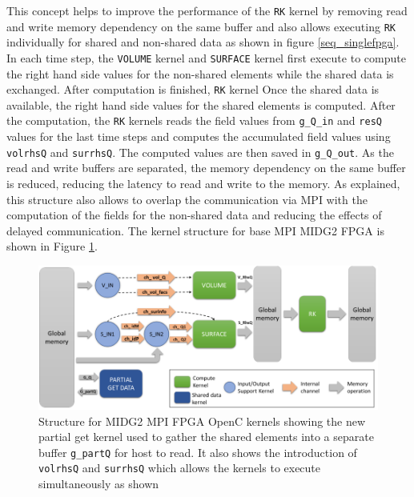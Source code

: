 This concept helps to improve the performance of the \texttt{RK} kernel
by removing read and write memory dependency on the same buffer and also allows executing
\texttt{RK} individually for shared and non-shared data as shown in figure \ref{seq_singlefpga}.
In each time step, the \texttt{VOLUME} kernel and \texttt{SURFACE} kernel first execute to compute the right hand side values for the
non-shared elements while the shared data is exchanged. After computation is finished, \texttt{RK} kernel Once the shared data is available,
the right hand side values for the shared elements is computed. After the computation,
the \texttt{RK} kernels reads the field values from \texttt{g\_Q\_in} and \texttt{resQ} values
for the last time steps and computes the accumulated field values using
\texttt{volrhsQ} and \texttt{surrhsQ}. The computed values are then saved in \texttt{g\_Q\_out}.
As the read and write buffers are separated, the memory dependency on the same buffer is reduced,
reducing the latency to read and write to the memory. As explained, this structure also allows
to overlap the communication via MPI with the computation of the fields for the non-shared data
and reducing the effects of delayed communication. The kernel structure for base MPI MIDG2 FPGA
is shown in Figure \ref{fig:base_kernstruc}.
\begin{figure}[ht]%
    \centering
    \includegraphics[width=1.0\textwidth]{images/base_kernstruc}
    \caption{Structure for MIDG2 MPI FPGA OpenC kernels showing the new partial get kernel used to gather
     the shared elements into a separate buffer \texttt{g\_partQ} for host to read. It also shows the introduction
     of \texttt{volrhsQ} and \texttt{surrhsQ} which allows the kernels to execute simultaneously as shown}
    \label{fig:base_kernstruc}
\end{figure}